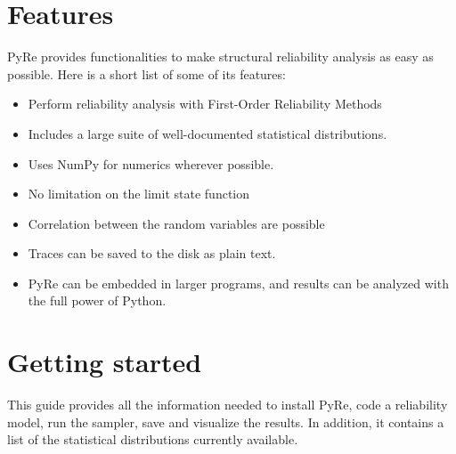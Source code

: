 \documentclass[letterpaper,10pt,english]{sphinxmanual}
\begin{document}
\section{Features}
\label{README:features}
PyRe provides functionalities to make structural reliability analysis as easy
as possible. Here is a short list of some of its features:
\begin{itemize}
\item {} 
Perform reliability analysis with First-Order Reliability Methods

\item {} 
Includes a large suite of well-documented statistical distributions.

\item {} 
Uses NumPy for numerics wherever possible.

\item {} 
No limitation on the limit state function

\item {} 
Correlation between the random variables are possible

\item {} 
Traces can be saved to the disk as plain text.

\item {} 
PyRe can be embedded in larger programs, and results can be analyzed
with the full power of Python.

\end{itemize}


\section{Getting started}
\label{README:getting-started}
This guide provides all the information needed to install PyRe, code a
reliability model, run the sampler, save and visualize the results. In
addition, it contains a list of the statistical distributions currently
available.
\end{document}
